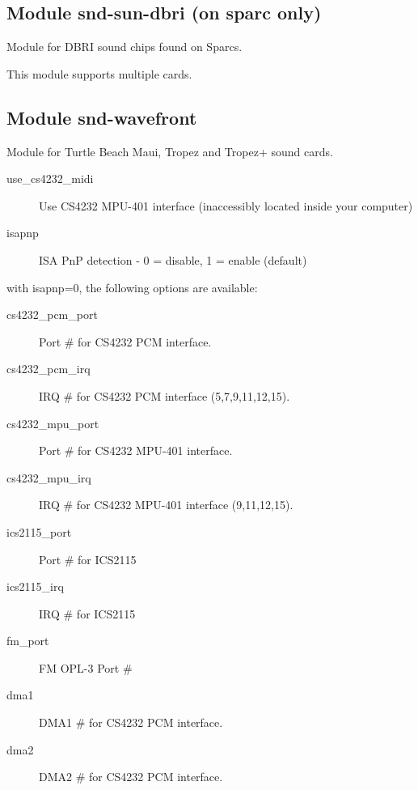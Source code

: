 \documentclass[a4paper,8pt,english]{sphinxmanual}
\begin{document}
\subsection{Module snd-sun-dbri (on sparc only)}
\label{sound/alsa-configuration:module-snd-sun-dbri-on-sparc-only}
Module for DBRI sound chips found on Sparcs.

This module supports multiple cards.


\subsection{Module snd-wavefront}
\label{sound/alsa-configuration:module-snd-wavefront}
Module for Turtle Beach Maui, Tropez and Tropez+ sound cards.
\begin{description}
\item[{use\_cs4232\_midi}] \leavevmode
Use CS4232 MPU-401 interface
(inaccessibly located inside your computer)

\item[{isapnp}] \leavevmode
ISA PnP detection - 0 = disable, 1 = enable (default)

\end{description}

with isapnp=0, the following options are available:
\begin{description}
\item[{cs4232\_pcm\_port}] \leavevmode
Port \# for CS4232 PCM interface.

\item[{cs4232\_pcm\_irq}] \leavevmode
IRQ \# for CS4232 PCM interface (5,7,9,11,12,15).

\item[{cs4232\_mpu\_port}] \leavevmode
Port \# for CS4232 MPU-401 interface.

\item[{cs4232\_mpu\_irq}] \leavevmode
IRQ \# for CS4232 MPU-401 interface (9,11,12,15).

\item[{ics2115\_port}] \leavevmode
Port \# for ICS2115

\item[{ics2115\_irq}] \leavevmode
IRQ \# for ICS2115

\item[{fm\_port}] \leavevmode
FM OPL-3 Port \#

\item[{dma1}] \leavevmode
DMA1 \# for CS4232 PCM interface.

\item[{dma2}] \leavevmode
DMA2 \# for CS4232 PCM interface.

\end{description}
\end{document}
